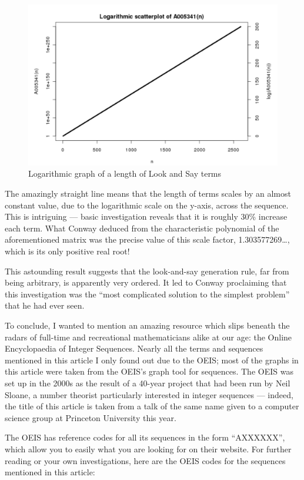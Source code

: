 \begin{figure}
\caption{Logarithmic graph of a length of Look and Say terms}
\centering
\includegraphics{LookAndSayLength.JPG}
\end{figure}

The amazingly straight line means that the length of terms scales by an almost constant value, due to the logarithmic scale on the y-axis, across the sequence. This is intriguing --- basic investigation reveals that it is roughly 30\% increase each term. What Conway deduced from the characteristic polynomial of the aforementioned matrix was the precise value of this scale factor, 1.303577269\ldots, which is its only positive real root!\par
This astounding result suggests that the look-and-say generation rule, far from being arbitrary, is apparently very ordered. It led to Conway proclaiming that this investigation was the “most complicated solution to the simplest problem” that he had ever seen.\par
To conclude, I wanted to mention an amazing resource which slips beneath the radars of full-time and recreational mathematicians alike at our age: the Online Encyclopaedia of Integer Sequences. Nearly all the terms and sequences mentioned in this article I only found out due to the OEIS; most of the graphs in this article were taken from the OEIS’s graph tool for sequences. The OEIS was set up in the 2000s as the result of a 40-year project that had been run by Neil Sloane, a number theorist particularly interested in integer sequences --- indeed, the title of this article is taken from a talk of the same name given to a computer science group at Princeton University this year.\par
The OEIS has reference codes for all its sequences in the form “AXXXXXX”, which allow you to easily what you are looking for on their website. For further reading or your own investigations, here are the OEIS codes for the sequences mentioned in this article:

